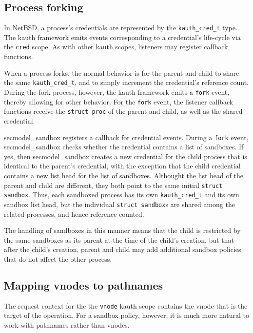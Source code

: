 \documentclass[letterpaper,twocolumn,9pt]{article}
\begin{document}
\subsection{Process forking}
In NetBSD, a process's credentials are represented by the
\texttt{kauth\_cred\_t} type.  The kauth framework emits events
corresponding to a credential's life-cycle via the \texttt{cred} scope.  As with
other kauth scopes, listeners may register callback functions.

When a process forks, the normal behavior is for the parent and child to share
the same \texttt{kauth\_cred\_t}, and to simply increment the credential's
reference count.  During the fork process, however, the kauth framework
emits a \texttt{fork} event, thereby allowing for other behavior.  For the
\texttt{fork} event, the listener callback functions receive the \texttt{struct
proc} of the parent and child, as well as the shared credential.

secmodel\_sandbox registers a callback for credential events.  During a
\texttt{fork} event, secmodel\_sandbox checks whether the credential contains a
list of sandboxes.  If yes, then secmodel\_sandbox creates a new credential for
the child process that is identical to the parent's credential, with the
exception that the child credential contains a new list head for the list of
sandboxes.  Althought the list head of the parent and child are different, they
both point to the same initial \texttt{struct sandbox}.  Thus, each sandboxed
process has its own \texttt{kauth\_cred\_t} and its own sandbox list head, but
the individual \texttt{struct sandbox}s are shared among the related processes,
and hence reference counted.

The handling of sandboxes in this manner means that the child is restricted by
the same sandboxes as its parent at the time of the child's creation, but that
after the child's creation, parent and child may add additional sandbox
policies that do not affect the other process.

\subsection{Mapping vnodes to pathnames}
The request context for the the \texttt{vnode} kauth scope contains the vnode
that is the target of the operation.  For a sandbox policy, however, it is much
more natural to work with pathnames rather than vnodes.
\end{document}
